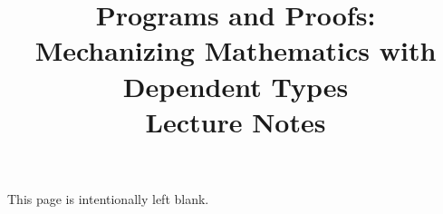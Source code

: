 \documentclass[12pt]{report}
\title{Programs and Proofs:
\\
Mechanizing Mathematics with Dependent Types
\\
{\normalsize Lecture Notes}
}
\author{}
\begin{document}
\maketitle

\thispagestyle{empty}
\mbox{}\vfill

\begin{center}

This page is intentionally left blank.

\end{center}

\clearpage
{}
{}

\setcounter{page}{1}
\tableofcontents













\clearpage
{}
{}



\end{document}
